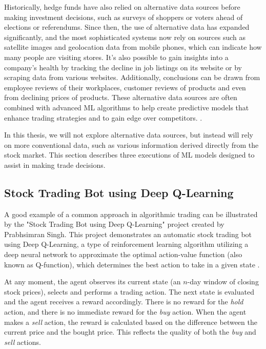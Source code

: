 \documentclass[a4paper,oneside,onecolumn,12pt]{book}
\begin{document}
	Historically, hedge funds have also relied on alternative data sources before making investment decisions, such as surveys of shoppers or voters ahead of elections or referendums. Since then, the use of alternative data has expanded significantly, and the most sophisticated systems now rely on sources such as satellite images and geolocation data from mobile phones, which can indicate how many people are visiting stores. It's also possible to gain insights into a company's health by tracking the decline in job listings on its website or by scraping data from various websites. Additionally, conclusions can be drawn from employee reviews of their workplaces, customer reviews of products and even from declining prices of products. These alternative data sources are often combined with advanced ML algorithms to help create predictive models that enhance trading strategies and to gain edge over competitors. \cite{MLAT}.

	In this thesis, we will not explore alternative data sources, but instead will rely on more conventional data, such as various information derived directly from the stock market. This section describes three executions of ML models designed to assist in making trade decisions.

	\subsection{Stock Trading Bot using Deep Q-Learning \cite{STBDQ}}
	A good example of a common approach in algorithmic trading can be illustrated by the "Stock Trading Bot using Deep Q-Learning" project created by Prabhsimran Singh. This project demonstrates an automatic stock trading bot using Deep Q-Learning, a type of reinforcement learning algorithm utilizing a deep neural network to approximate the optimal action-value function (also known as Q-function), which determines the best action to take in a given state \cite{HCTDRL}.

	At any moment, the agent observes its current state (an $n$-day window of closing stock prices), selects and performs a trading action. The next state is evaluated and the agent receives a reward accordingly. There is no reward for the \textit{hold} action, and there is no immediate reward for the \textit{buy} action. When the agent makes a \textit{sell} action, the reward is calculated based on the difference between the current price and the bought price. This reflects the quality of both the \textit{buy} and \textit{sell} actions.
\end{document}
